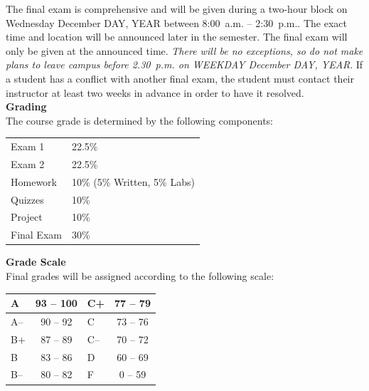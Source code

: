 \documentclass[11pt,letterpaper]{article}
\newcommand{\lefthead}[2]{\noindent\textbf{#1}\hfill\\[#2]}
\begin{document}
\noindent The final exam is comprehensive and will be given during a two-hour block on Wednesday December DAY, YEAR between 8:00~a.m. -- 2:30~p.m.. The exact time and location will be announced later in the semester. The final exam will only be given at the announced time. \emph{There will be no exceptions, so do not make plans to leave campus before 2.30~p.m. on WEEKDAY December DAY, YEAR}. If a student has a conflict with another final exam, the student must contact their instructor at least two weeks in advance in order to have it resolved. \\[0.3cm]





\lefthead{Grading}{0.3cm}
\noindent The course grade is determined by the following components:
	\begin{table}[H]
	\centering
	\begin{tabular}{ll}
        Exam 1 & 22.5\% \\
        Exam 2 & 22.5\% \\
        Homework & 10\% (5\% Written, 5\% Labs) \\
        Quizzes & 10\% \\
        Project & 10\% \\
        Final Exam & 30\%
        \end{tabular}
        \end{table} \vspace{0.3cm}





\lefthead{Grade Scale}{0.3cm}
\noindent Final grades will be assigned according to the following scale: \\
        \begin{center}
        \begin{tabular}{|l||c|l||c|} \hline
        A & 93 -- 100 & C+ & 77 -- 79 \\ \hline
        A-- & 90 -- 92 & C & 73 -- 76 \\ \hline
        B+ & 87 -- 89 & C-- & 70 -- 72 \\ \hline
        B & 83 -- 86 & D & 60 -- 69 \\ \hline
        B-- & 80 -- 82 & F & 0 -- 59 \\ \hline
        \end{tabular}
        \end{center} \vspace{0.3cm}
\end{document}
